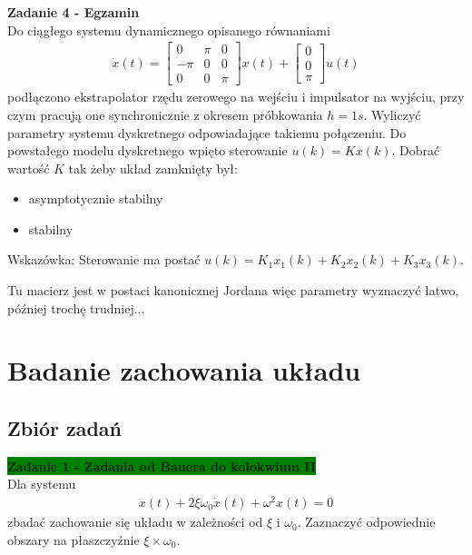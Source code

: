 \documentclass[a4paper,11pt]{article}
\begin{document}
\newpage
\begin{framed}
\textbf{Zadanie 4 - Egzamin} \\ 
Do ciągłego systemu dynamicznego opisanego równaniami
\begin{align*}
\dot{x}(t)=
\begin{bmatrix}
0 & \pi & 0 \\
-\pi & 0 & 0 \\
0 & 0 & \pi
\end{bmatrix}
x(t) + 
\begin{bmatrix}
0 \\
0 \\
\pi 
\end{bmatrix}
u(t)
\end{align*}
podłączono ekstrapolator rzędu zerowego na wejściu i impulsator na wyjściu, przy czym pracują one synchronicznie z okresem próbkowania \( h = 1s \). Wyliczyć parametry systemu dyskretnego odpowiadające takiemu połączeniu. Do powstałego modelu dyskretnego wpięto sterowanie \( u(k) = Kx(k) \). Dobrać wartość \( K \) tak żeby układ zamknięty był:
\begin{itemize}
\item asymptotycznie stabilny
\item stabilny
\end{itemize}
Wskazówka: Sterowanie ma postać \( u(k) = K_1x_1(k)+K_2x_2(k)+K_3x_3(k) \).
\end{framed}
Tu macierz jest w postaci kanonicznej Jordana więc parametry wyznaczyć łatwo, później trochę trudniej... 






\newpage
\section{Badanie zachowania układu}
\subsection{Zbiór zadań}
\begin{framed}
\textbf{\colorbox{green}{Zadanie 1 - Zadania od Bauera do kolokwium II }} \\ 
Dla systemu
\begin{align*}
\ddot{x}(t)+2\xi \omega_{0}\dot{x}(t)+\omega^{2}x(t) = 0
\end{align*}
zbadać zachowanie się układu w zależności od \( \xi \) i \( \omega_{0} \). Zaznaczyć odpowiednie obszary na płaszczyźnie \( \xi \times \omega_{0} \). 
\end{framed}
\end{document}
